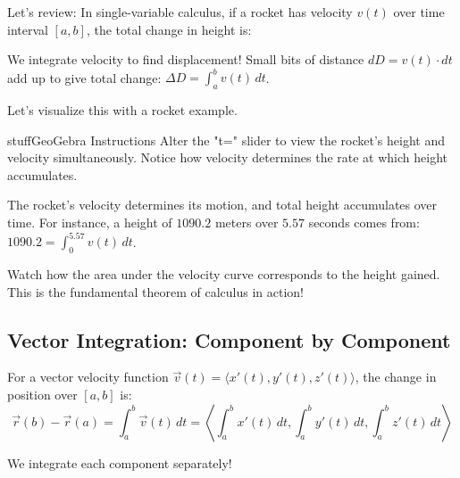 \documentclass{ximera}
\begin{document}
\begin{problem}
Let's review: In single-variable calculus, if a rocket has velocity $v(t)$ over time interval $[a,b]$, the total change in height is:

\begin{multipleChoice}
\end{multipleChoice}

\begin{feedback}
We integrate velocity to find displacement! Small bits of distance $dD = v(t) \cdot dt$ add up to give total change: $\Delta D = \int_a^b v(t) \, dt$.
\end{feedback}
\end{problem}

\begin{problem}
Let's visualize this with a rocket example.

\begin{expandable}{stuff}{GeoGebra Instructions}
    Alter the "t=" slider to view the rocket's height and velocity simultaneously. Notice how velocity determines the rate at which height accumulates.
\end{expandable}

\begin{center}
\end{center}

The rocket's velocity determines its motion, and total height accumulates over time. For instance, a height of $1090.2$ meters over $5.57$ seconds comes from: $1090.2 = \int_0^{5.57} v(t) \, dt$.

\begin{feedback}
Watch how the area under the velocity curve corresponds to the height gained. This is the fundamental theorem of calculus in action!
\end{feedback}
\end{problem}

\subsection*{Vector Integration: Component by Component}

\begin{definition}
For a vector velocity function $\vec{v}(t)=\langle x'(t), y'(t), z'(t)\rangle$, the change in position over $[a,b]$ is:
$$\vec{r}(b)-\vec{r}(a)= \int_a^b \vec{v}(t)\, dt=\left\langle \int_a^b x'(t)\, dt, \int_a^b y'(t)\, dt, \int_a^b z'(t)\, dt\right\rangle$$

We integrate each component separately!
\end{definition}
\end{document}
